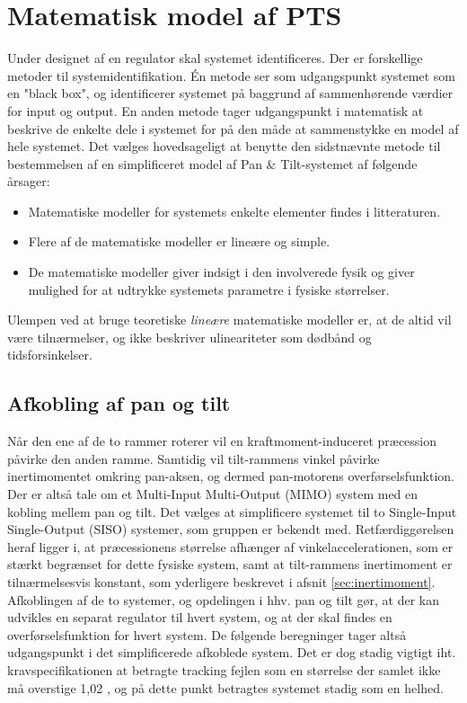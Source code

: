\section{Matematisk model af PTS}
\label{sec:matPTS}
Under designet af en regulator skal systemet identificeres. Der er forskellige metoder til systemidentifikation.
Én metode ser som udgangspunkt systemet som en "black box", og identificerer systemet
på baggrund af sammenhørende værdier for input og output.
En anden metode tager udgangspunkt i matematisk at beskrive de enkelte dele i systemet
for på den måde at sammenstykke en model af hele systemet.
Det vælges hovedsageligt at benytte den sidstnævnte metode til bestemmelsen af en simplificeret
model af Pan \& Tilt-systemet af følgende årsager:
\begin{itemize}
\itemsep1pt
\item Matematiske modeller for systemets enkelte elementer findes i litteraturen.
\item Flere af de matematiske modeller er lineære og simple.
\item De matematiske modeller giver indsigt i den involverede fysik og giver mulighed
	for at udtrykke systemets parametre i fysiske størrelser.
\end{itemize}
Ulempen ved at bruge teoretiske \textit{lineære} matematiske modeller er,
at de altid vil være tilnærmelser, og ikke beskriver ulineariteter som dødbånd og tidsforsinkelser.

%
\subsection{Afkobling af pan og tilt}
Når den ene af de to rammer roterer vil en kraftmoment-induceret præcession påvirke den anden ramme.
Samtidig vil tilt-rammens vinkel påvirke inertimomentet omkring pan-aksen, og dermed
pan-motorens overførselsfunktion.
Der er altså tale om et Multi-Input Multi-Output (MIMO) system med en kobling mellem pan og tilt.
Det vælges at simplificere systemet til to Single-Input Single-Output (SISO) systemer, som gruppen er bekendt med.
Retfærdiggørelsen heraf ligger i, at præcessionens størrelse afhænger af vinkelaccelerationen, som er stærkt begrænset
for dette fysiske system, samt at tilt-rammens inertimoment er tilnærmelsesvis konstant, som yderligere beskrevet i afsnit \ref{sec:inertimoment}.
Afkoblingen af de to systemer, og opdelingen i hhv. pan og tilt gør, at der kan udvikles en separat regulator
til hvert system, og at der skal findes en overførselsfunktion for hvert system.
De følgende beregninger tager altså udgangspunkt i det simplificerede afkoblede system.
Det er dog stadig vigtigt iht. kravspecifikationen at betragte tracking fejlen som en størrelse der samlet
ikke må overstige 1,02 \degree, og på dette punkt betragtes systemet stadig som en helhed.

